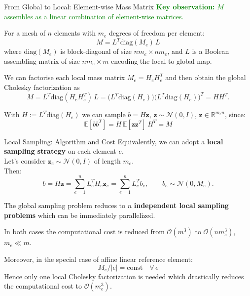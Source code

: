 \documentclass[
  english,            %
  aspectratio=169,    %
]{tumbeamer}
\begin{document}

\begin{frame}{From Global to Local: Element-wise Mass Matrix}
\textcolor{green}{\textbf{Key observation:} $M$ assembles as a linear combination of element-wise matrices.}

\bigskip
For a mesh of $n$ elements with $m_e$ degrees of freedom per element:
\begin{equation}
  M = L^T \mathrm{diag}(M_e)\, L
\end{equation}
where $\mathrm{diag}(M_e)$ is block-diagonal of size $nm_e \times nm_e$, and $L$ is a
Boolean assembling matrix of size $nm_e \times m$ encoding the local-to-global map.

\bigskip
We can factorise each local mass matrix $M_e = H_e H_e^T$ and then obtain the global Cholesky factorization as
\begin{equation}
  M = L^T \mathrm{diag}(H_e H_e^T)\,L
  = \bigl(L^T \mathrm{diag}(H_e)\bigr)\bigl(L^T \mathrm{diag}(H_e)\bigr)^T
  = HH^T.
\end{equation}

With $H := L^T \mathrm{diag}(H_e)$ we can sample $b = H\mathbf{z}$, $\mathbf{z} \sim \mathcal{N}(0,I)$,
$\mathbf{z} \in \mathbb{R}^{m_e n}$, since:
\begin{equation}
  \mathbb{E}[bb^T] = H\,\mathbb{E}[\mathbf{z}\mathbf{z}^T]\,H^T = M
\end{equation}

\end{frame}


\begin{frame}{Local Sampling: Algorithm and Cost}
Equivalently, we can adopt a \textbf{local sampling strategy} on each element $e$. \\
Let's consider $\mathbf{z}_e \sim \mathcal{N}(0,I)$ of length $m_e$. \\
Then:
\begin{equation}
  b = H\mathbf{z} = \sum_{e=1}^n L_e^T H_e \mathbf{z}_e = \sum_{e=1}^n L_e^T b_e,
  \qquad b_e \sim \mathcal{N}(0, M_e).
\end{equation}

The global sampling problem reduces to $n$ \textbf{independent local sampling problems} which can be immediately parallelized. \\
\bigskip

In both cases the computational cost is reduced from $\mathcal{O}(m^3)$ to $\mathcal{O}(nm_e^3)$, $m_e \ll m$.
\bigskip

Moreover, in the special case of affine linear reference element:
\[ M_e / |e| = \mathrm{const}\quad\forall\, e \]
Hence only one local Cholesky factorization is needed which drastically reduces the computational cost to $\mathcal{O}(m_e^3)$.

\end{frame}
\end{document}
